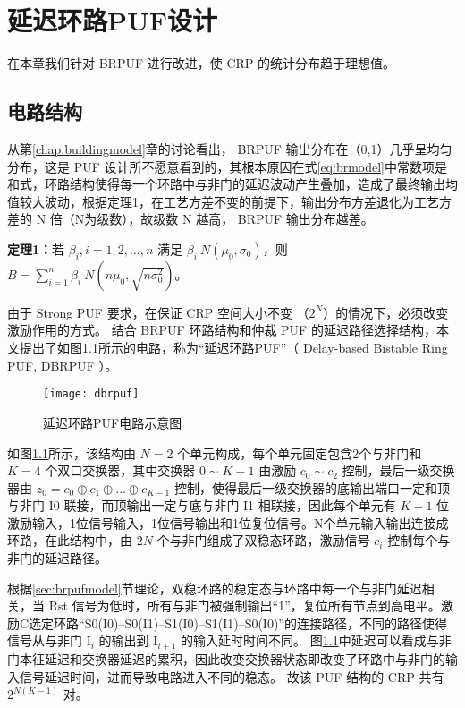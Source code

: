 
\chapter{延迟环路PUF设计}\label{chap:dbrpuf}
在本章我们针对 BRPUF 进行改进，使 CRP 的统计分布趋于理想值。

\section{电路结构}\label{sec:dbrpuf_scheme}
从第\ref{chap:buildingmodel}章的讨论看出， BRPUF 输出分布在（0,1）几乎呈均匀分布，这是 PUF 设计所不愿意看到的，其根本原因在式\ref{eq:brmodel}中常数项是和式，环路结构使得每一个环路中与非门的延迟波动产生叠加，造成了最终输出均值较大波动，根据定理1，在工艺方差不变的前提下，输出分布方差退化为工艺方差的 N 倍（N为级数），故级数 N 越高， BRPUF 输出分布越差。

\textbf{定理1：}若 $ \beta_i, i=1,2,...,n $ 满足 $ \beta_i~N(\mu_0,\sigma_0) $，则 $ B=\sum\limits_{i=1}^{n}\beta_i~N(n\mu_0,\sqrt{n\sigma^2_0}) $。

由于 Strong PUF 要求，在保证 CRP 空间大小不变 （$ 2^N $）的情况下，必须改变激励作用的方式。
结合 BRPUF 环路结构和仲裁 PUF 的延迟路径选择结构，本文提出了如图\ref{fig:dbrpuf}所示的电路，称为``延迟环路PUF''（ Delay-based Bistable Ring PUF, DBRPUF ）。

\begin{figure}[htb]
\centering
\texttt{[image: dbrpuf]}
\caption{延迟环路PUF电路示意图}
\label{fig:dbrpuf}
\end{figure}

如图\ref{fig:dbrpuf}所示，该结构由 $ N=2 $ 个单元构成，每个单元固定包含2个与非门和 $ K=4 $ 个双口交换器，其中交换器 $ 0\sim K-1 $ 由激励 $ c_0\sim c_2 $ 控制，最后一级交换器由 $ z_0=c_0\oplus c_1\oplus...\oplus c_{K-1}  $ 控制，使得最后一级交换器的底输出端口一定和顶与非门 I0 联接，而顶输出一定与底与非门 I1 相联接，因此每个单元有 $ K-1 $ 位激励输入，1位信号输入，1位信号输出和1位复位信号。N个单元输入输出连接成环路，在此结构中，由 $ 2N $ 个与非门组成了双稳态环路，激励信号 $ c_i $  控制每个与非门的延迟路径。

根据\ref{sec:brpufmodel}节理论，双稳环路的稳定态与环路中每一个与非门延迟相关，当 Rst 信号为低时，所有与非门被强制输出``1''，复位所有节点到高电平。激励C选定环路``S0(I0)--S0(I1)--S1(I0)--S1(I1)--S0(I0)''的连接路径，不同的路径使得信号从与非门 $ \text{I}_i $ 的输出到 $ \text{I}_{i+1} $ 的输入延时时间不同。
图\ref{fig:dbrpuf}中延迟可以看成与非门本征延迟和交换器延迟的累积，因此改变交换器状态即改变了环路中与非门的输入信号延迟时间，进而导致电路进入不同的稳态。
故该 PUF 结构的 CRP 共有 $ 2^{N(K-1)} $ 对。

